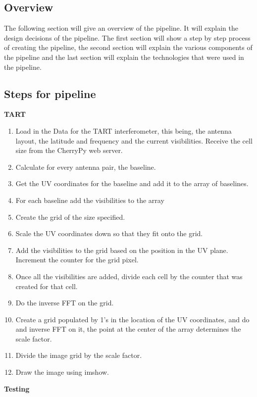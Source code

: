 \subsection{Overview}
The following section will give an overview of the pipeline. It will explain the design decisions of the pipeline. The first section will show a step by step process of creating the pipeline, the second section will explain the various components of the pipeline and the last section will explain the technologies that were used in the pipeline.
\subsection{Steps for pipeline}
\textbf{TART}
\begin{enumerate}
    \item Load in the Data for the TART interferometer, this being, the antenna layout, the latitude and frequency and the current visibilities. Receive the cell size from the CherryPy web server.
    \item Calculate for every antenna pair, the baseline.
    \item Get the UV coordinates for the baseline and add it to the array of baselines.
    \item For each baseline add the visibilities to the array
    \item Create the grid of the size specified.
    \item Scale the UV coordinates down so that they fit onto the grid.
    \item Add the visibilities to the grid based on the position in the UV plane. Increment the counter for the grid pixel.
    \item Once all the visibilities are added, divide each cell by the counter that was created for that cell.
    \item Do the inverse FFT on the grid.
    \item Create a grid populated by 1's in the location of the UV coordinates, and do and inverse FFT on it, the point at the center of the array determines the scale factor. 
    \item Divide the image grid by the scale factor.
    \item Draw the image using imshow.
\end{enumerate}
\textbf{Testing}
